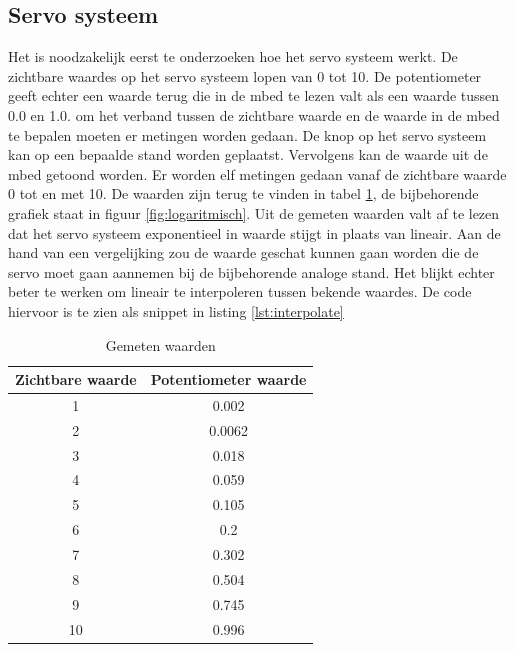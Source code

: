 \documentclass[a4paper]{article}
\begin{document}
		\subsection{Servo systeem}
		Het is noodzakelijk eerst te onderzoeken hoe het servo systeem werkt. De zichtbare waardes op het servo systeem lopen van 0 tot 10. De potentiometer geeft echter een waarde terug die in de mbed te lezen valt als een waarde tussen 0.0 en 1.0. om het verband tussen de zichtbare waarde en de waarde in de mbed te bepalen moeten er metingen worden gedaan. De knop op het servo systeem kan op een bepaalde stand worden geplaatst. Vervolgens kan de waarde uit de mbed getoond worden. Er worden elf metingen gedaan vanaf de zichtbare waarde 0 tot en met 10. De waarden zijn terug te vinden in tabel \ref{tab:gemeten}, de bijbehorende grafiek staat in figuur \ref{fig:logaritmisch}. Uit de gemeten waarden valt af te lezen dat het servo systeem exponentieel in waarde stijgt in plaats van lineair. Aan de hand van een vergelijking zou de waarde geschat kunnen gaan worden die de servo moet gaan aannemen bij de bijbehorende analoge stand. Het blijkt echter beter te werken om lineair te interpoleren tussen bekende waardes. De code hiervoor is te zien als snippet in listing \ref{lst:interpolate}\\
	\begin{table}[h]
		\begin{centering}
			\begin{tabular}{| c | c |}
				\hline
				Zichtbare waarde & Potentiometer waarde \\ \hline\hline
				1 & 0.002 \\\hline
				2 & 0.0062 \\\hline
				3 & 0.018 \\\hline
				4 & 0.059 \\\hline
				5 & 0.105 \\\hline
				6 & 0.2 \\\hline
				7 & 0.302 \\\hline
				8 & 0.504 \\\hline
				9 & 0.745 \\\hline
				10 & 0.996 \\
				\hline
			\end{tabular}
			\caption{Gemeten waarden}
			\label{tab:gemeten}
		\end{centering}
	\end{table}
\end{document}
